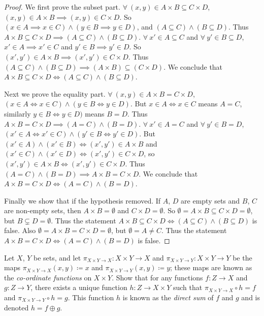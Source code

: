 \begin{proof}
We first prove the subset part.
\(\forall\ (x, y) \in A \times B \subseteq C \times D\), \((x, y) \in A \times B \implies (x, y) \in C \times D\).
So \((x \in A \implies x \in C) \land (y \in B \implies y \in D)\), and \((A \subseteq C) \land (B \subseteq D)\).
Thus \(A \times B \subseteq C \times D \implies (A \subseteq C) \land (B \subseteq D)\).
\(\forall\ x' \in A \subseteq C\) and \(\forall\ y' \in B \subseteq D\), \(x' \in A \implies x' \in C\) and \(y' \in B \implies y' \in D\).
So \((x', y') \in A \times B \implies (x', y') \in C \times D\).
Thus \((A \subseteq C) \land (B \subseteq D) \implies (A \times B) \subseteq (C \times D)\).
We conclude that \(A \times B \subseteq C \times D \iff (A \subseteq C) \land (B \subseteq D)\).

Next we prove the equality part.
\(\forall\ (x, y) \in A \times B = C \times D\), \((x \in A \iff x \in C) \land (y \in B \iff y \in D)\).
But \(x \in A \iff x \in C\) means \(A = C\), similarly \(y \in B \iff y \in D)\) means \(B = D\).
Thus \(A \times B = C \times D \implies (A = C) \land (B = D)\).
\(\forall\ x' \in A = C\) and \(\forall\ y' \in B = D\), \((x' \in A \iff x' \in C) \land (y' \in B \iff y' \in D)\).
But \((x' \in A) \land (x' \in B) \iff (x', y') \in A \times B\) and \((x' \in C) \land (x' \in D) \iff (x', y') \in C \times D\), so \((x', y') \in A \times B \iff (x', y') \in C \times D\).
Thus \((A = C) \land (B = D) \implies A \times B = C \times D\).
We conclude that \(A \times B = C \times D \iff (A = C) \land (B = D)\).

Finally we show that if the hypothesis removed.
If \(A\), \(D\) are empty sets and \(B\), \(C\) are non-empty sets, then \(A \times B = \emptyset\) and \(C \times D = \emptyset\).
So \(\emptyset = A \times B \subseteq C \times D = \emptyset\), but \(B \subsetneq D = \emptyset\).
Thus the statement \(A \times B \subseteq C \times D \iff (A \subseteq C) \land (B \subseteq D)\) is false.
Also \(\emptyset = A \times B = C \times D = \emptyset\), but \(\emptyset = A \neq C\).
Thus the statement \(A \times B = C \times D \iff (A = C) \land (B = D)\) is false.
\end{proof}

\begin{exercise}\label{ex 3.5.7}
Let \(X\), \(Y\) be sets, and let \(\pi_{X \times Y \to X} : X \times Y \to X\) and \(\pi_{X \times Y \to Y} : X \times Y \to Y\) be the maps \(\pi_{X \times Y \to X}(x, y) \coloneqq x\) and \(\pi_{X \times Y \to Y}(x, y) \coloneqq y\);
these maps are known as the \emph{co-ordinate functions} on \(X \times Y\).
Show that for any functions \(f : Z \to X\) and \(g : Z \to Y\), there exists a unique function \(h : Z \to X \times Y\) such that \(\pi_{X \times Y \to X} \circ h = f\) and \(\pi_{X \times Y \to Y} \circ h = g\).
This function \(h\) is known as the \emph{direct sum} of \(f\) and \(g\) and is denoted \(h = f \oplus g\).
\end{exercise}

